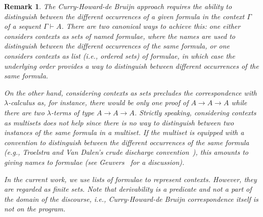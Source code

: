 \documentclass{svjour3}                     %
\newtheorem{rem}[thm]{Remark}
\newcommand{\imp}{\rightarrow}
\begin{document}
\begin{rem}
  The Curry-Howard-de Bruijn approach requires the ability to distinguish between the different occurrences of a given formula in the context $\Gamma$ of a sequent $\Gamma \vdash A$. There are two canonical ways to achieve this: one either considers contexts as sets of {\em named} formulae, where the names are used to distinguish between the different occurrences of the same formula, or one considers contexts as list (i.e., ordered sets) of formulae, in which case the underlying order provides a way to distinguish between different occurrences of the same formula. 

  On the other hand, considering contexts as sets precludes the correspondence with $\lambda$-calculus as, for instance, there would be only one proof of $A \imp A \imp A$ while there are two $\lambda$-terms of type $A \imp A \imp A$. Strictly speaking, considering contexts as multisets does not help since there is no way to distinguish between two instances of the same formula in a multiset. If the multiset is equipped with a convention to distinguish between the different occurrences of the same formula (e.g., Troelstra and Van Dalen's crude discharge convention~\cite[Ch.~1]{TroelstraVanDalen88-1}), this amounts to giving names to formulae (see Geuvers~\cite{GeuversPhD} for a discussion).

In the current work, we use lists of formulae to represent contexts. However, they are regarded as finite sets. Note that derivability is a predicate and not a part of the domain of the discourse, i.e., Curry-Howard-de Bruijn correspondence itself is not on the program.


\end{rem}
\end{document}
